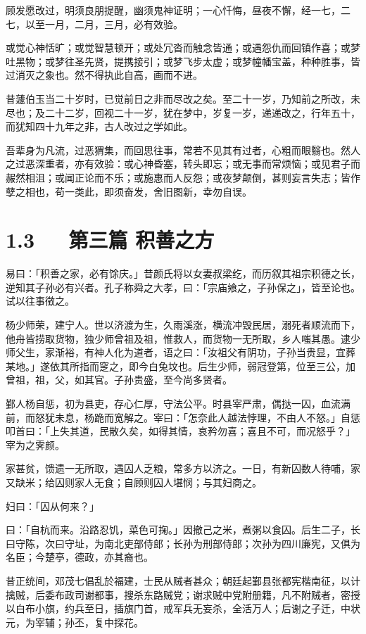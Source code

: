\documentclass[letterpaper,10pt,english]{sphinxmanual}
\begin{document}
顾发愿改过，明须良朋提醒，幽须鬼神证明；一心忏悔，昼夜不懈，经一七，二七，以至一月，二月，三月，必有效验。

或觉心神恬旷；或觉智慧顿开；或处冗沓而触念皆通；或遇怨仇而回镇作喜；或梦吐黑物；或梦往圣先贤，提携接引；或梦飞步太虚；或梦幢幡宝盖，种种胜事，皆过消灭之象也。然不得执此自高，画而不进。

昔蘧伯玉当二十岁时，已觉前日之非而尽改之矣。至二十一岁，乃知前之所改，未尽也；及二十二岁，回视二十一岁，犹在梦中，岁复一岁，递递改之，行年五十，而犹知四十九年之非，古人改过之学如此。

吾辈身为凡流，过恶猬集，而回思往事，常若不见其有过者，心粗而眼翳也。然人之过恶深重者，亦有效验：或心神昏塞，转头即忘；或无事而常烦恼；或见君子而赧然相沮；或闻正论而不乐；或施惠而人反怨；或夜梦颠倒，甚则妄言失志；皆作孽之相也，苟一类此，即须奋发，舍旧图新，幸勿自误。


\section{1.3   第三篇 积善之方}
\label{\detokenize{p00_u5176_u5b83/_u8881_u4e86_u51e1-_u4e86_u51e1_u56db_u8bad:id5}}
易曰：「积善之家，必有馀庆。」昔颜氏将以女妻叔梁纥，而历叙其祖宗积德之长，逆知其子孙必有兴者。孔子称舜之大孝，曰：「宗庙飨之，子孙保之」，皆至论也。试以往事徵之。

杨少师荣，建宁人。世以济渡为生，久雨溪涨，横流冲毁民居，溺死者顺流而下，他舟皆捞取货物，独少师曾祖及祖，惟救人，而货物一无所取，乡人嗤其愚。逮少师父生，家渐裕，有神人化为道者，语之曰：「汝祖父有阴功，子孙当贵显，宜葬某地。」遂依其所指而窆之，即今白兔坟也。后生少师，弱冠登第，位至三公，加曾祖，祖，父，如其官。子孙贵盛，至今尚多贤者。

鄞人杨自惩，初为县吏，存心仁厚，守法公平。时县宰严肃，偶挞一囚，血流满前，而怒犹未息，杨跪而宽解之。宰曰：「怎奈此人越法悖理，不由人不怒。」自惩叩首曰：「上失其道，民散久矣，如得其情，哀矜勿喜；喜且不可，而况怒乎？」宰为之霁颜。

家甚贫，馈遗一无所取，遇囚人乏粮，常多方以济之。一日，有新囚数人待哺，家又缺米；给囚则家人无食；自顾则囚人堪悯；与其妇商之。

妇曰：「囚从何来？」

曰：「自杭而来。沿路忍饥，菜色可掬。」因撤己之米，煮粥以食囚。后生二子，长曰守陈，次曰守址，为南北吏部侍郎；长孙为刑部侍郎；次孙为四川廉宪，又俱为名臣；今楚亭，德政，亦其裔也。

昔正统间，邓茂七倡乱於福建，士民从贼者甚众；朝廷起鄞县张都宪楷南征，以计擒贼，后委布政司谢都事，搜杀东路贼党；谢求贼中党附册籍，凡不附贼者，密授以白布小旗，约兵至日，插旗门首，戒军兵无妄杀，全活万人；后谢之子迁，中状元，为宰辅；孙丕，复中探花。
\end{document}
